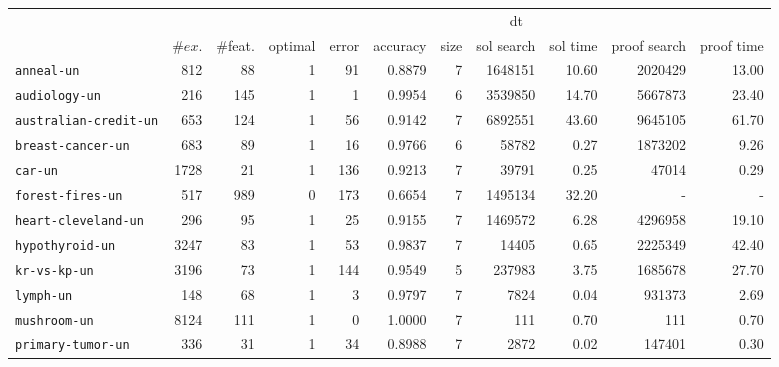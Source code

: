 \begin{tabular}{lccrrrrrrrr}
\toprule
& && \multicolumn{8}{c}{dt}\\
\cmidrule(rr){4-11}
&\multirow{1}{*}{$\#ex.$} & \multirow{1}{*}{\#feat.} &  \multicolumn{1}{c}{optimal} & \multicolumn{1}{c}{error} & \multicolumn{1}{c}{accuracy} & \multicolumn{1}{c}{size} & \multicolumn{1}{c}{sol search} & \multicolumn{1}{c}{sol time} & \multicolumn{1}{c}{proof search} & \multicolumn{1}{c}{proof time} \\
\midrule

\texttt{anneal-un} & \multicolumn{1}{r}{812} & \multicolumn{1}{r}{88}  & 1 & 91 & 0.8879 & 7 & 1648151 & 10.60 & 2020429 & 13.00\\
\texttt{audiology-un} & \multicolumn{1}{r}{216} & \multicolumn{1}{r}{145}  & 1 & 1 & 0.9954 & 6 & 3539850 & 14.70 & 5667873 & 23.40\\
\texttt{australian-credit-un} & \multicolumn{1}{r}{653} & \multicolumn{1}{r}{124}  & 1 & 56 & 0.9142 & 7 & 6892551 & 43.60 & 9645105 & 61.70\\
\texttt{breast-cancer-un} & \multicolumn{1}{r}{683} & \multicolumn{1}{r}{89}  & 1 & 16 & 0.9766 & 6 & 58782 & 0.27 & 1873202 & 9.26\\
\texttt{car-un} & \multicolumn{1}{r}{1728} & \multicolumn{1}{r}{21}  & 1 & 136 & 0.9213 & 7 & 39791 & 0.25 & 47014 & 0.29\\
\texttt{forest-fires-un} & \multicolumn{1}{r}{517} & \multicolumn{1}{r}{989}  & 0 & 173 & 0.6654 & 7 & 1495134 & 32.20 & - & -\\
\texttt{heart-cleveland-un} & \multicolumn{1}{r}{296} & \multicolumn{1}{r}{95}  & 1 & 25 & 0.9155 & 7 & 1469572 & 6.28 & 4296958 & 19.10\\
\texttt{hypothyroid-un} & \multicolumn{1}{r}{3247} & \multicolumn{1}{r}{83}  & 1 & 53 & 0.9837 & 7 & 14405 & 0.65 & 2225349 & 42.40\\
\texttt{kr-vs-kp-un} & \multicolumn{1}{r}{3196} & \multicolumn{1}{r}{73}  & 1 & 144 & 0.9549 & 5 & 237983 & 3.75 & 1685678 & 27.70\\
\texttt{lymph-un} & \multicolumn{1}{r}{148} & \multicolumn{1}{r}{68}  & 1 & 3 & 0.9797 & 7 & 7824 & 0.04 & 931373 & 2.69\\
\texttt{mushroom-un} & \multicolumn{1}{r}{8124} & \multicolumn{1}{r}{111}  & 1 & 0 & 1.0000 & 7 & 111 & 0.70 & 111 & 0.70\\
\texttt{primary-tumor-un} & \multicolumn{1}{r}{336} & \multicolumn{1}{r}{31}  & 1 & 34 & 0.8988 & 7 & 2872 & 0.02 & 147401 & 0.30\\

\end{tabular}
